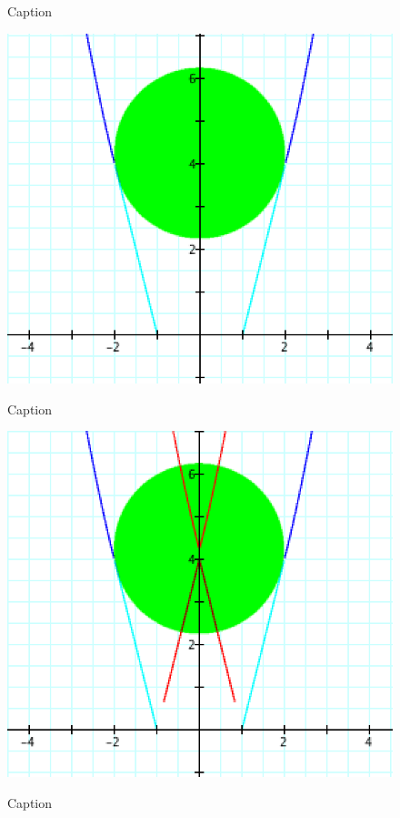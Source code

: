 {\begin{figure}[H]
\begin{minipage}[b]{\w}
      \caption{Caption}
    \end{minipage}
    \begin{minipage}[b]{\w}
      \centering
      \label{crunch:11}
      \includegraphics[width=\fw]{img/09-crunch/11.png}
      \caption{Caption}
    \end{minipage}
    \begin{minipage}[b]{\w}
      \centering
      \label{crunch:12}
      \includegraphics[width=\fw]{img/09-crunch/12.png}
      \caption{Caption}
    \end{minipage}
  \end{figure}

}

